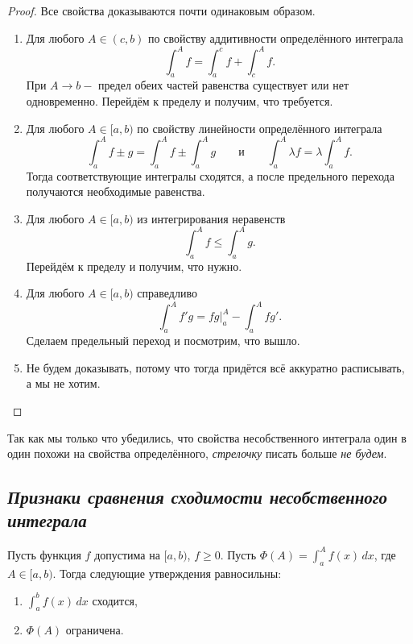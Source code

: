 \begin{proof}
	Все свойства доказываются почти одинаковым образом.
	\begin{enumerate}
		\item Для любого \(A \in (c, b)\) по свойству аддитивности определённого интеграла \[
		\int_a^A f = \int_a^c f + \int_c^A f.
		\]
		При \(A \to b-\) предел обеих частей равенства существует или нет одновременно. Перейдём к пределу и получим, что требуется.
		\item Для любого \(A \in [a, b)\) по свойству линейности определённого интеграла \[
		\int_a^A f \pm g = \int_a^A f \pm \int_a^A g \qquad \text{и} \qquad \int_a^A \lambda f = \lambda \int_a^A f.
		\]
		Тогда соответствующие интегралы сходятся, а после предельного перехода получаются необходимые равенства.
		\item Для любого \(A \in [a, b)\) из интегрирования неравенств \[
		\int_a^A f \leqslant\int_a^A g.
		\]
		Перейдём к пределу и получим, что нужно.
		\item Для любого \(A \in [a, b)\) справедливо \[
		\int_a^A f'g = fg \bigg|_a^A - \int_a^A fg'.
		\]
		Сделаем предельный переход и посмотрим, что вышло.
		\item Не будем доказывать, потому что тогда придётся всё аккуратно расписывать, а мы не хотим.
	\end{enumerate}
\end{proof}

\begin{remark}
	Так как мы только что убедились, что свойства несобственного интеграла один в один похожи на свойства определённого, \textit{стрелочку} писать больше \textit{не будем}.
\end{remark}

\subsection{\itshape Признаки сравнения сходимости несобственного интеграла}

\hypertarget{srshlem}{}
\begin{lemma}
	Пусть функция \(f\) допустима на \([a, b)\), \(f \geqslant 0\). Пусть \(\Phi(A) = \displaystyle\int_a^A f(x) \, dx\), где \(A \in [a, b)\). Тогда следующие утверждения равносильны:
	\begin{enumerate}
		\item \(\displaystyle\int_a^b f(x) \, dx\) сходится,
		\item \(\Phi(A)\) ограничена.
	\end{enumerate}
\end{lemma}

